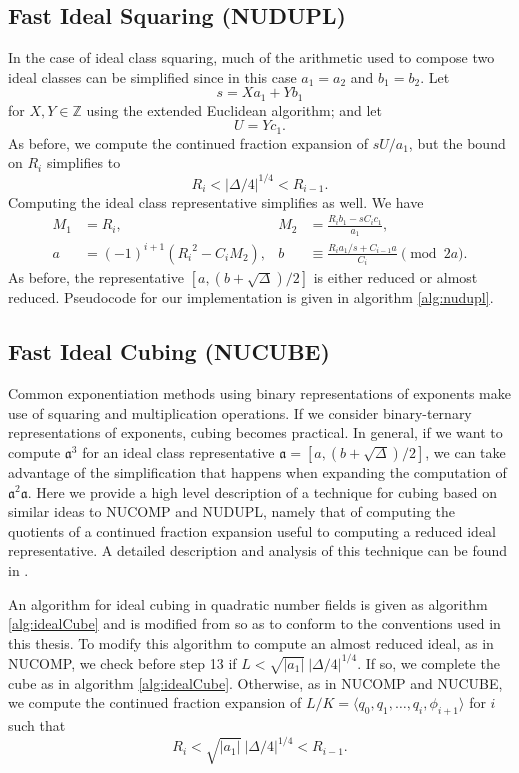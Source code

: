 \documentclass{ucalgthes1}
\theoremstyle{plain}
\theoremstyle{definition}
\newcommand{\ZZ}{\mathbb{Z}}
\begin{document}
\subsection{Fast Ideal Squaring (NUDUPL)}\label{subsec:nudupl}

In the case of ideal class squaring, much of the arithmetic used to compose two ideal classes can be simplified since in this case $a_1=a_2$ and $b_1=b_2$.  Let 
\[
	s = Xa_1 + Yb_1
\]
for $X,Y \in \ZZ$ using the extended Euclidean algorithm; and let 
\[
	U = Yc_1.
\]
As before, we compute the continued fraction expansion of $sU/a_1$, but the bound on $R_i$ simplifies to
\[
	R_i < |\Delta/4|^{1/4} < R_{i-1}.
\]
Computing the ideal class representative simplifies as well.  We have
\begin{align*}
	M_1 &= R_i, & 
	M_2 &= \frac{R_i b_1 - sC_i c_1}{a_1}, \\
	a &= (-1)^{i+1}({R_i}^2 - C_i M_2), &
	b &\equiv \frac{R_i a_1/s  + C_{i-1} a}{C_i} \pmod{2a}.
\end{align*}
As before, the representative $[a, (b+\sqrt\Delta)/2]$ is either reduced or almost reduced.  \break Pseudocode for our implementation is given in algorithm \ref{alg:nudupl}.


\subsection{Fast Ideal Cubing (NUCUBE)}\label{subsec:nucube}

Common exponentiation methods using binary representations of exponents make use of squaring and multiplication operations.  If we consider binary-ternary representations of exponents, cubing becomes practical.  In general, if we want to compute ${\mathfrak a}^3$ for an ideal class representative $\mathfrak a = [a, (b+\sqrt\Delta)/2]$, we can take advantage of the simplification that happens when expanding the computation of ${\mathfrak a}^2 \mathfrak a$.  Here we provide a high level description of a technique for cubing based on similar ideas to NUCOMP and NUDUPL, namely that of computing the quotients of a continued fraction expansion useful to computing a reduced ideal representative.  A detailed description and analysis of this technique can be found in \cite{Ijs2010}.

An algorithm for ideal cubing in quadratic number fields is given as algorithm \ref{alg:idealCube} and is modified from \cite[Appendix A, Algorithm 5]{Ijs2010} so as to conform to the conventions used in this thesis. To modify this algorithm to compute an almost reduced ideal, as in NUCOMP, we check before step 13 if $L < \sqrt{|a_1|} ~ |\Delta/4|^{1/4}$.  If so, we complete the cube as in algorithm \ref{alg:idealCube}.  Otherwise, as in NUCOMP and NUCUBE, we compute the continued fraction expansion of $L/K = \langle q_0, q_1, \dots, q_i, \phi_{i+1}\rangle$ for $i$ such that
\[
	R_i < \sqrt{|a_1|} ~ |\Delta/4|^{1/4} < R_{i-1}.
\]
\end{document}
